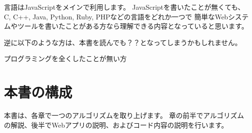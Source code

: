 言語はJavaScriptをメインで利用します。
JavaScriptを書いたことが無くても、C, C++, Java, Python, Ruby, PHPなどの言語をどれか一つで
簡単なWebシステムやツールを書いたことがある方なら理解できる内容となっていると思います。

逆に以下のような方は、本書を読んでも？？となってしまうかもしれません。

\begin{starterenumerate}
\item プログラミングを全くしたことが無い方
\end{starterenumerate}

\section*{本書の構成}
\label{sec:-6}

本書は、各章で一つのアルゴリズムを取り上げます。
章の前半でアルゴリズムの解説、後半でWebアプリの説明、およびコード内容の説明を行います。
